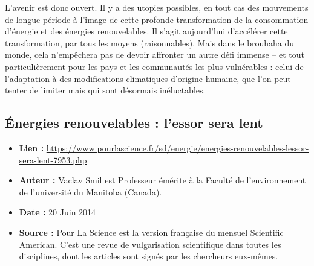 \documentclass[8pt]{article}
\begin{document}
L’avenir est donc ouvert. Il y a des utopies possibles, en tout cas des mouvements de longue période à l’image de cette profonde transformation de la consommation d’énergie et des énergies renouvelables. Il s’agit aujourd’hui d’accélérer cette transformation, par tous les moyens (raisonnables).
Mais dans le brouhaha du monde, cela n’empêchera pas de devoir affronter un autre défi immense – et tout particulièrement pour les pays et les communautés les plus vulnérables : celui de l’adaptation à des modifications climatiques d’origine humaine, que l’on peut tenter de limiter mais qui sont désormais inéluctables.

\subsection{Énergies renouvelables : l'essor sera lent}
\begin{itemize}
	\item \textbf{Lien : }  \url{https://www.pourlascience.fr/sd/energie/energies-renouvelables-lessor-sera-lent-7953.php} 
	\item \textbf{Auteur : } Vaclav Smil est Professeur émérite à la Faculté de l'environnement de l'université du Manitoba (Canada).
	\item \textbf{Date : } 20 Juin 2014
	\item \textbf{Source : } Pour La Science est la version française du mensuel Scientific American. C'est une revue de vulgarisation scientifique dans toutes les disciplines, dont les articles sont signés par les chercheurs eux-mêmes.
\end{itemize}



\end{document}
